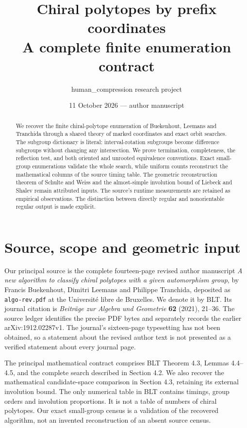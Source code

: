 \documentclass[11pt]{article}
\title{Chiral polytopes by prefix coordinates\\\large A complete finite enumeration contract}
\author{human\_compression research project}
\date{11 October 2026 --- author manuscript}
\theoremstyle{remark}\newtheorem{remark}[theorem]{Remark}
\begin{document}
\maketitle
\begin{abstract}
We recover the finite chiral-polytope enumeration of Buekenhout, Leemans and Tranchida through a shared theory of marked coordinates and exact orbit searches. The subgroup dictionary is literal: interval-rotation subgroups become difference subgroups without changing any intersection. We prove termination, completeness, the reflection test, and both oriented and unrooted equivalence conventions. Exact small-group enumerations validate the whole search, while uniform counts reconstruct the mathematical columns of the source timing table. The geometric reconstruction theorem of Schulte and Weiss and the almost-simple involution bound of Liebeck and Shalev remain attributed inputs. The source's runtime measurements are retained as empirical observations. The distinction between directly regular and nonorientable regular output is made explicit.
\end{abstract}

\section{Source, scope and geometric input}

Our principal source is the complete fourteen-page revised author manuscript
\emph{A new algorithm to classify chiral polytopes with a given automorphism group}, by Francis Buekenhout, Dimitri Leemans and Philippe Tranchida, deposited as \texttt{algo-rev.pdf} at the Universit\'e libre de Bruxelles. We denote it by BLT. Its journal citation is \emph{Beitr\"age zur Algebra und Geometrie} \textbf{62} (2021), 21--36. The source ledger identifies the precise PDF bytes and separately records the earlier arXiv:1912.02287v1. The journal's sixteen-page typesetting has not been obtained, so a statement about the revised author text is not presented as a verified statement about every journal page.

The principal mathematical contract comprises BLT Theorem 4.3, Lemmas 4.4--4.5, and the complete search described in Section 4.2. We also recover the mathematical candidate-space comparison in Section 4.3, retaining its external involution bound. The only numerical table in BLT contains timings, group orders and involution proportions. It is not a table of numbers of chiral polytopes. Our exact small-group census is a validation of the recovered algorithm, not an invented reconstruction of an absent source census.
\end{document}
